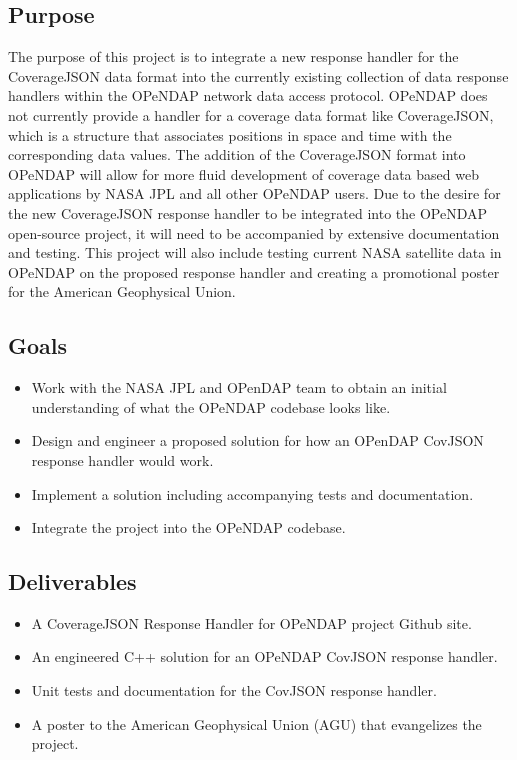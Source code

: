 \documentclass[onecolumn, draftclsnofoot,10pt, compsoc]{IEEEtran}
\begin{document}
\subsection{Purpose}
The purpose of this project is to integrate a new response handler for the CoverageJSON data format into the currently existing collection of data response handlers within the OPeNDAP network data access protocol. OPeNDAP does not currently provide a handler for a coverage data format like CoverageJSON, which is a structure that associates positions in space and time with the corresponding data values. The addition of the CoverageJSON format into OPeNDAP will allow for more fluid development of coverage data based web applications by NASA JPL and all other OPeNDAP users. Due to the desire for the new CoverageJSON response handler to be integrated into the OPeNDAP open-source project, it will need to be accompanied by extensive documentation and testing. This project will also include testing current NASA satellite data in OPeNDAP on the proposed response handler and creating a promotional poster for the American Geophysical Union.

\subsection{Goals}
\begin{itemize}
\item Work with the NASA JPL and OPenDAP team to obtain an initial understanding of what the OPeNDAP codebase looks like.
\item Design and engineer a proposed solution for how an OPenDAP CovJSON response handler would work.
\item Implement a solution including accompanying tests and documentation.
\item Integrate the project into the OPeNDAP codebase.
\end{itemize}

\subsection{Deliverables}
\begin{itemize}
\item A CoverageJSON Response Handler for OPeNDAP project Github site.
\item An engineered C++ solution for an OPeNDAP CovJSON response handler.
\item Unit tests and documentation for the CovJSON response handler.
\item A poster to the American Geophysical Union (AGU) that evangelizes the project.
\end{itemize}
\end{document}
